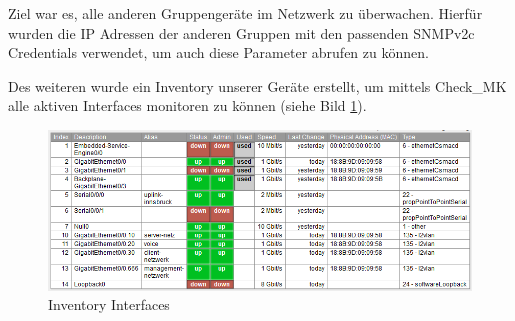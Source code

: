 Ziel war es, alle anderen Gruppengeräte im Netzwerk zu überwachen. Hierfür wurden die \ac{IP} Adressen der anderen Gruppen mit den passenden SNMPv2c Credentials verwendet, um auch diese Parameter abrufen zu können.


Des weiteren wurde ein Inventory unserer Geräte erstellt, um mittels Check\_MK alle aktiven Interfaces monitoren zu können (siehe Bild \ref{img:inventory_interfaces}).

\begin{figure}[H]
	\centering
	\includegraphics[scale=0.65]{img/inventory_interfaces.PNG}
	\caption{Inventory Interfaces}
	\label{img:inventory_interfaces}
\end{figure}